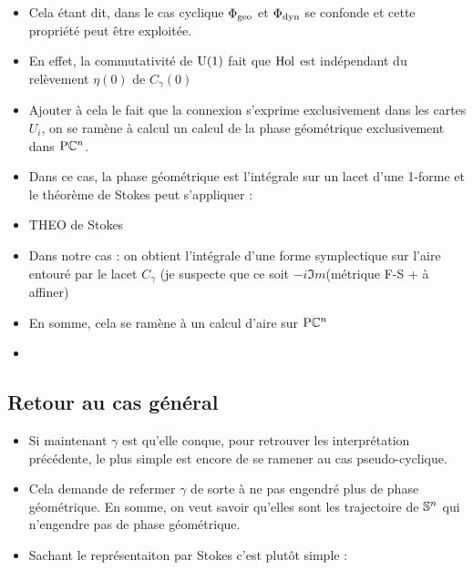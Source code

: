 \begin{itemize}
	
	\item Cela étant dit, dans le cas cyclique $\phaseg$ et $\phased$ se confonde et cette propriété peut être exploitée.
	
	\item En effet,  la commutativité de $\U{1}$ fait que $\Hol$ est indépendant du relèvement $\eta(0)$ de $C_\gamma(0)$ 
	
	\item Ajouter à cela le fait que la connexion s'exprime exclusivement dans les cartes $U_i$, on se ramène à calcul un calcul de la phase géométrique exclusivement dans $\PC{n}$.
	
	\item Dans ce cas, la phase géométrique est l'intégrale sur un lacet d'une 1-forme et le théorème de Stokes peut s'appliquer :
	
	\item THEO de Stokes
	
	\item Dans notre cas : on obtient l’intégrale d'une forme symplectique sur l'aire entouré par le lacet $C_\gamma$ (je suspecte que ce soit $-i\Im m$(métrique F-S + à affiner) 
	
	\item En somme, cela se ramène à un calcul d'aire sur $\PC{n}$
	
	\item {}
	
\end{itemize}


\subsection{Retour au cas général}

\begin{itemize}
	\item Si maintenant $\gamma$ est qu'elle conque, pour retrouver les interprétation précédente, le plus simple est encore de se ramener au cas pseudo-cyclique.
	
	\item Cela demande de refermer $\gamma$ de sorte à ne pas engendré plus de phase géométrique. En somme, on veut savoir qu'elles sont les trajectoire de $\S{n}$ qui n'engendre pas de phase géométrique.
	
	\item Sachant le représentaiton par Stokes c'est plutôt simple : 
\end{itemize}




